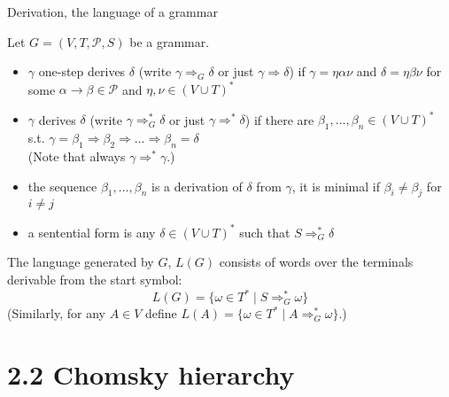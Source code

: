 \documentclass[handout]{beamer}
\begin{document}
\begin{frame}{Derivation, the language of a grammar}

	Let $G=(V,T,\mathcal P,S)$ be a grammar.
	\begin{itemize}
		\item $\gamma$ \alert{one-step derives} $\delta$ (write \alert{$\gamma\Rightarrow_G\delta$} or just \alert{$\gamma\Rightarrow\delta$}) if $\gamma=\eta\alpha\nu$ and $\delta=\eta\beta\nu$ for some $\alpha\to\beta\in\mathcal P$ and $\eta,\nu\in(V\cup T)^*$
		
		\item $\gamma$ \alert{derives} $\delta$ (write \alert{$\gamma\Rightarrow_G^*\delta$} or just \alert{$\gamma\Rightarrow^*\delta$}) if there are $\beta_1,\dots,\beta_n\in (V\cup T)^*$ s.t.
		$\gamma=\beta_1\Rightarrow\beta_2\Rightarrow\dots\Rightarrow\beta_n=\delta$\\
		(Note that always $\gamma\Rightarrow^*\gamma$.)

		\item the sequence $\beta_1,\dots,\beta_n$ is a \alert{derivation} of $\delta$ from $\gamma$, it is \alert{minimal} if $\beta_i\neq\beta_j$ for $i\neq j$
		\item a \alert{sentential form} is any $\delta\in(V\cup T)^*$ such that $S\Rightarrow_G^*\delta$		
	\end{itemize}

	The language \alert{generated by } $G$, \alert{$L(G)$} consists of words over the terminals derivable from the start symbol:
	\alert{$$
	L(G)=\{\omega\in T^*\mid S\Rightarrow^*_G \omega\}
	$$}
	(Similarly, for any $A\in V$ define $L(A)=\{\omega\in T^*\mid A\Rightarrow^*_G \omega\}$.)
	
\end{frame}


\section{2.2 Chomsky hierarchy}
\end{document}
